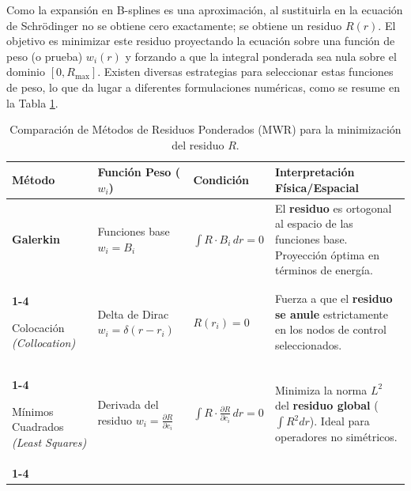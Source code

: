 \documentclass[12pt, a4paper, oneside, spanish]{book}
\begin{document}
Como la expansión en B-splines es una aproximación, al sustituirla en la ecuación de Schrödinger no se obtiene cero exactamente; se obtiene un residuo \( R(r) \). El objetivo es minimizar este residuo proyectando la ecuación sobre una función de peso (o prueba) \( w_i(r) \) y forzando a que la integral ponderada sea nula sobre el dominio \( [0,R_{\text{max}}] \). Existen diversas estrategias para seleccionar estas funciones de peso, lo que da lugar a diferentes formulaciones numéricas, como se resume en la Tabla \cref{tab:mwr-methods}.

\begin{table}[htbp]
    \centering
    \caption{Comparación de Métodos de Residuos Ponderados (MWR) para la minimización del residuo $R$.}
    \label{tab:mwr-methods}
    \renewcommand{\arraystretch}{2.0} %
    \setlength{\tabcolsep}{8pt}       %
    
    \begin{tabularx}{\textwidth}{ 
        >{\RaggedRight\bfseries}m{2.5cm}  
        >{\RaggedRight}m{3.5cm}           
        >{\centering}m{3.5cm}             
        >{\RaggedRight\arraybackslash}X   
    }
        \toprule
        Método & Función Peso ($w_i$) & Condición & Interpretación \newline Física/Espacial \\
        \midrule
        
        Galerkin & 
        Funciones base \newline $w_i = B_i$ & 
        $\displaystyle \int R \cdot B_i \, dr = 0$ & 
        El \textbf{residuo} es ortogonal al espacio de las funciones base. Proyección óptima en términos de energía. \\
        \cmidrule{1-4}
        
        Colocación \newline \textit{\footnotesize (Collocation)} & 
        Delta de Dirac \newline $w_i = \delta(r - r_i)$ & 
        $R(r_i) = 0$ & 
        Fuerza a que el \textbf{residuo se anule} estrictamente en los nodos de control seleccionados. \\
        \cmidrule{1-4}
        
        Mínimos Cuadrados \newline \textit{\footnotesize (Least \newline Squares)} & 
        Derivada del \newline residuo \newline $w_i = \frac{\partial R}{\partial c_i}$ & 
        $\displaystyle \int R \cdot \frac{\partial R}{\partial c_i} \, dr = 0$ & 
        Minimiza la norma $L^2$ del \textbf{residuo global} ($\int R^2 dr$). Ideal para operadores no simétricos. \\
        \cmidrule{1-4}
        

\end{tabularx}
\end{table}
\end{document}
